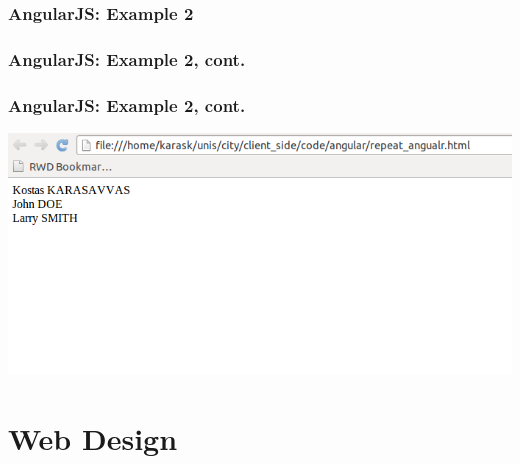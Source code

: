 \documentclass{beamer}
\begin{document}
\begin{frame}[fragile]\frametitle{AngularJS: Example 2} 

  
  
\end{frame}




\begin{frame}[fragile]\frametitle{AngularJS: Example 2, cont.} 

  

\end{frame}




\begin{frame}[fragile]\frametitle{AngularJS: Example 2, cont.} 

  \begin{center}
    \includegraphics[scale=0.50]{images/repeat_angular.png}    
  \end{center}

\end{frame}





\section{Web Design}
\end{document}
